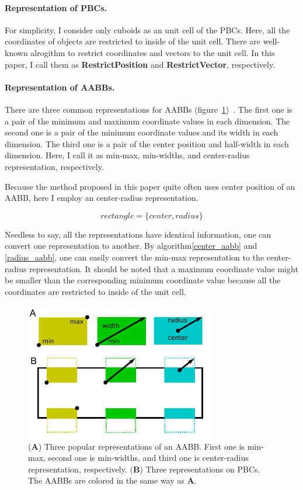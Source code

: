 \documentclass[10pt,letterpaper,twocolumn]{article}
\begin{document}
\paragraph{Representation of PBCs.}
For simplicity, I consider only cuboids as an unit cell of the PBCs.
Here, all the coordinates of objects are restricted to inside of the unit cell.
There are well-known alrogithm to restrict coordinates and vectors to the unit cell.
In this paper, I call them as \textbf{RestrictPosition} and
\textbf{RestrictVector}, respectively.

\paragraph{Representation of AABBs.}
There are three common representations for AABBs
(figure~\ref{fig-rectangle-rep})~\cite{real-time-collision-detection}.
The first one is a pair of the minimum and maximum coordinate values
in each dimension. The second one is a pair of the minimum coordinate values and
its width in each dimension. The third one is a pair of the center position and
half-width in each dimension. Here, I call it as min-max, min-widths, and
center-radius representation, respectively.

Because the method proposed in this paper quite often uses center position of
an AABB, here I employ an center-radius representation.

\begin{equation}
    rectangle = \{center, radius\}
\end{equation}

Needless to say, all the representations have identical information, one can
convert one representation to another. By algorithm\ref{center_aabb} and
\ref{radius_aabb}, one can easily convert the min-max representation to
the center-radius representation. It should be noted that a maximum coordinate
value might be smaller than the corresponding minimum coordinate value because
all the coordinates are restricted to inside of the unit cell.

\begin{figure}[hbt]
    \includegraphics[width=8.4cm, bb=2 6 226 165]{fig-rect-rep.eps}
    \caption{
    (\textbf{A})
    Three popular representations of an AABB. First one is min-max,
    second one is min-widths, and third one is center-radius representation,
    respectively.
    (\textbf{B})
    Three representations on PBCs. The AABBs are colored in the same way as
    \textbf{A}.
    }
    \label{fig-rectangle-rep}
\end{figure}
\end{document}
